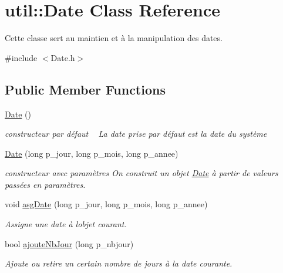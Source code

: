 \hypertarget{classutil_1_1Date}{}\section{util\+:\+:Date Class Reference}
\label{classutil_1_1Date}


Cette classe sert au maintien et à la manipulation des dates.  




{\ttfamily \#include $<$Date.\+h$>$}

\subsection*{Public Member Functions}
\begin{DoxyCompactItemize}
\item 
\mbox{\label{classutil_1_1Date_a03f7ca00aa80f113bc7c0ebfbd769f54}} 
\hyperlink{classutil_1_1Date_a03f7ca00aa80f113bc7c0ebfbd769f54}{Date} ()
\begin{DoxyCompactList}\small\item\em constructeur par défaut ~\newline
La date prise par défaut est la date du système \end{DoxyCompactList}\item 
\hyperlink{classutil_1_1Date_a06b8340e5beed84c885c89d41a750330}{Date} (long p\+\_\+jour, long p\+\_\+mois, long p\+\_\+annee)
\begin{DoxyCompactList}\small\item\em constructeur avec paramètres On construit un objet \hyperlink{classutil_1_1Date}{Date} à partir de valeurs passées en paramètres. \end{DoxyCompactList}\item 
void \hyperlink{classutil_1_1Date_ab82f59d834f60b929ca130f15e5279c3}{asg\+Date} (long p\+\_\+jour, long p\+\_\+mois, long p\+\_\+annee)
\begin{DoxyCompactList}\small\item\em Assigne une date à l\textquotesingle{}objet courant. \end{DoxyCompactList}\item 
bool \hyperlink{classutil_1_1Date_a7788599612a71d89126d649fdaaced3d}{ajoute\+Nb\+Jour} (long p\+\_\+nbjour)
\begin{DoxyCompactList}\small\item\em Ajoute ou retire un certain nombre de jours à la date courante. \end{DoxyCompactList}\item 

\end{DoxyCompactItemize}

